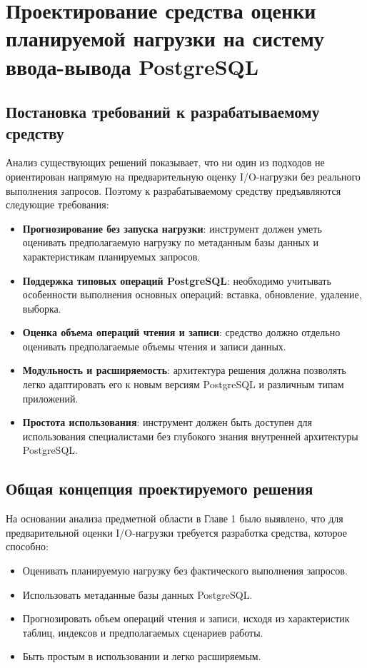 \section{Проектирование средства оценки планируемой нагрузки на систему ввода-вывода PostgreSQL}

\subsection{Постановка требований к разрабатываемому средству}

Анализ существующих решений показывает, что ни один из подходов не ориентирован напрямую на предварительную оценку I/O-нагрузки без реального выполнения запросов. Поэтому к разрабатываемому средству предъявляются следующие требования:

\begin{itemize}
    \item \textbf{Прогнозирование без запуска нагрузки}: инструмент должен уметь оценивать предполагаемую нагрузку по метаданным базы данных и характеристикам планируемых запросов.
    \item \textbf{Поддержка типовых операций PostgreSQL}: необходимо учитывать особенности выполнения основных операций: вставка, обновление, удаление, выборка.
    \item \textbf{Оценка объема операций чтения и записи}: средство должно отдельно оценивать предполагаемые объемы чтения и записи данных.
    \item \textbf{Модульность и расширяемость}: архитектура решения должна позволять легко адаптировать его к новым версиям PostgreSQL и различным типам приложений.
    \item \textbf{Простота использования}: инструмент должен быть доступен для использования специалистами без глубокого знания внутренней архитектуры PostgreSQL.
\end{itemize}


\subsection{Общая концепция проектируемого решения}
На основании анализа предметной области в Главе 1 было выявлено, что для предварительной оценки I/O-нагрузки требуется разработка средства, которое способно:

\begin{itemize}
    \item Оценивать планируемую нагрузку без фактического выполнения запросов.
    \item Использовать метаданные базы данных PostgreSQL.
    \item Прогнозировать объем операций чтения и записи, исходя из характеристик таблиц, индексов и предполагаемых сценариев работы.
    \item Быть простым в использовании и легко расширяемым.
\end{itemize}

